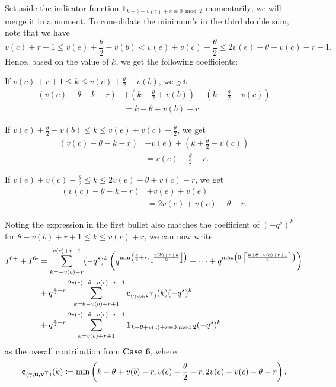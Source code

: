 Set aside the indicator function
$\mathbf{1}_{k + \theta + v(c) + r \equiv 0 \bmod 2}$ momentarily;
we will merge it in a moment.
To consolidate the minimum's in the third double sum,
note that we have
\[ v(c) + r + 1 \le v(e) + \frac{\theta}{2} - v(b)
< v(e) + v(c) - \frac{\theta}{2} \le 2v(e) - \theta + v(c) - r - 1. \]
Hence, based on the value of $k$, we get the following coefficients:
\begin{itemize}
  \ii If $v(c) + r + 1 \le k \le v(e) + \frac{\theta}{2} - v(b)$, we get
  \begin{align*}
    \left( v(c) - \theta - k - r \right)
    &+ \left( k - \frac{\theta}{2} + v(b) \right)
    + \left( k + \frac{\theta}{2} - v(c) \right)  \\
    &= k - \theta + v(b) - r.
  \end{align*}

  \ii If $v(e) + \frac{\theta}{2} - v(b) \le k \le v(e) + v(c) - \frac{\theta}{2}$, we get
  \begin{align*}
    \left( v(c) - \theta - k - r \right)
    &+ v(e)
    + \left( k + \frac{\theta}{2} - v(c) \right)  \\
    &= v(e) - \frac{\theta}{2} - r.
  \end{align*}

  \ii If $v(e) + v(c) - \frac{\theta}{2} \le k \le 2v(e) - \theta + v(c) - r$, we get
  \begin{align*}
    \left( v(c) - \theta - k - r \right)
    &+ v(e) + v(e) \\
    &= 2v(e) + v(c) - \theta - r.
  \end{align*}
\end{itemize}
Noting the expression in the first bullet also matches the coefficient of $(-q^s)^k$
for $\theta - v(b) + r + 1 \le k \le v(c) + r$, we can now write
\begin{align*}
  I^{\text{6+}} + I^{\text{6-}}
  &=
  \sum_{k = - v(b) - r}^{v(c) + r - 1} (-q^s)^k \left(
    q^{\min\left( \frac{\theta}{2} + r, \left\lfloor \frac{v(b) + r + k}{2} \right\rfloor \right)}
    + \dots
    + q^{\max\left(0, \left\lceil \frac{k + \theta - v(c) + r + 1}{2} \right\rceil \right)}
    \right) \\
  &+ q^{\frac{\theta}{2} + r}
  \sum_{k = \theta - v(b) + r + 1}^{2v(e) - \theta + v(c) - r - 1} \mathbf c_{(\gamma, \mathbf u, \mathbf v^\top)}(k)(-q^s)^k \\
  &+ q^{\frac{\theta}{2} + r}
  \sum_{k = v(c) + r + 1}^{2v(e) - \theta + v(c) - r - 1}
  \mathbf{1}_{k + \theta + v(c) + r \equiv 0 \bmod 2} (-q^s)^k
\end{align*}
as the overall contribution from \textbf{Case 6}, where
\[ \mathbf c_{(\gamma, \mathbf u, \mathbf v^\top)}(k) \coloneqq \min \left( k - \theta + v(b) - r,
  v(e) - \frac{\theta}{2} - r,
  2v(e) + v(c) - \theta - r \right). \]

